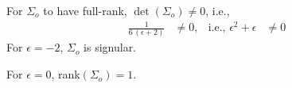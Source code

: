 For $\Sigma_o$ to have full-rank, $\det\left(\Sigma_o\right) \neq 0$, i.e., 
\begin{align*}
    \frac{1}{6\,\left(\epsilon + 2\right)} &\neq 0, & \text{i.e., } \epsilon^2 + \epsilon &\neq 0
\end{align*}
For $\epsilon = -2$, $\Sigma_o$ is signular.

For $\epsilon = 0$, rank$\left(\Sigma_o\right) = 1$. 


